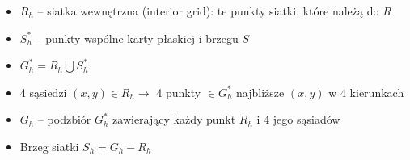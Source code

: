 \begin{frame}
  \begin{block}{}
    \begin{itemize}
      \item $R_h$ -- siatka wewnętrzna (interior grid): te punkty siatki, które należą do $R$
      \item $S_h^*$ -- punkty wspólne karty płaskiej i brzegu $S$
      \item $G_h^* = R_h \bigcup S_h^*$
      \item 4 sąsiedzi $(x,y) \in R_h \rightarrow$ 4 punkty $\in G_h^*$ najbliższe $(x,y)$ w 4 kierunkach
      \item $G_h$ -- podzbiór $G_h^*$ zawierający każdy punkt $R_h$ i 4 jego sąsiadów
      \item Brzeg siatki $S_h = G_h - R_h$
    \end{itemize}
  \end{block}
\end{frame}
